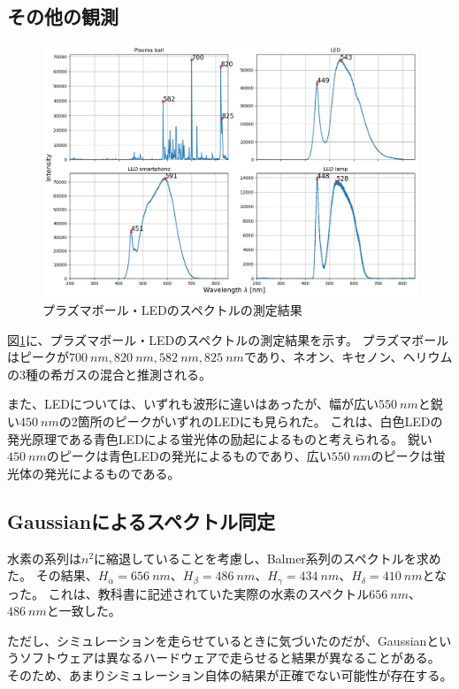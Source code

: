 \documentclass[a4paper]{ltjsarticle}
\begin{document}
\subsection{その他の観測}
\begin{figure}
    \centering
    \includegraphics[width=0.98\columnwidth]{./images/spectrum_others.png}
    \caption{プラズマボール・LEDのスペクトルの測定結果}
    \label{fig:spectrum_others}
\end{figure}
図\ref{fig:spectrum_others}に、プラズマボール・LEDのスペクトルの測定結果を示す。
プラズマボールはピークが$\SI{700}{nm}, \SI{820}{nm}, \SI{582}{nm}, \SI{825}{nm}$であり、ネオン、キセノン、ヘリウムの3種の希ガスの混合と推測される。

また、LEDについては、いずれも波形に違いはあったが、幅が広い$\SI{550}{nm}$と鋭い$\SI{450}{nm}$の2箇所のピークがいずれのLEDにも見られた。
これは、白色LEDの発光原理である青色LEDによる蛍光体の励起によるものと考えられる\cite{Webpage 1}。
鋭い$\SI{450}{nm}$のピークは青色LEDの発光によるものであり、広い$\SI{550}{nm}$のピークは蛍光体の発光によるものである。

\subsection{Gaussianによるスペクトル同定}
水素の系列は$n^2$に縮退していることを考慮し、Balmer系列のスペクトルを求めた。
その結果、$H_\alpha = \SI{656}{nm}$、$H_\beta = \SI{486}{nm}$、$H_\gamma = \SI{434}{nm}$、$H_\delta = \SI{410}{nm}$となった。
これは、教科書に記述されていた実際の水素のスペクトル$\SI{656}{nm}$、$\SI{486}{nm}$と一致した。

ただし、シミュレーションを走らせているときに気づいたのだが、Gaussianというソフトウェアは異なるハードウェアで走らせると結果が異なることがある。
そのため、あまりシミュレーション自体の結果が正確でない可能性が存在する。
\end{document}
